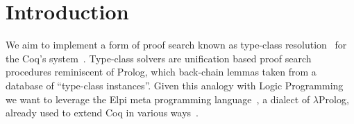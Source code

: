 \documentclass[sigconf,natbib=false,review]{acmart}
\newcommand{\UnifRel}{\ensuremath{\simeq}}
\newcommand{\Uo}{\texorpdfstring{\ensuremath{\UnifRel_o}\xspace}{unif\_o}}
\newcommand{\Ue}{\ensuremath{\UnifRel_m}\xspace}
\newcommand{\Fo}{\texorpdfstring{\ensuremath{\mathcal{O}}\xspace}{O}}
\newcommand{\Ho}{\texorpdfstring{\ensuremath{\mathcal{M}}\xspace}{M}}
\begin{document}
\begin{comment}
Specifying and implementing a proof system from scratch requires significant
effort. Logical Frameworks and Higher Order Logic Programming Languages provide
dedicated, high-level meta languages to facilitate this task in two ways: 1)
variable binding and substitution are for free when meta language binders
represent object logic ones; 2) proof construction, and
proof search, are greatly simplified by leveraging the unification procedure
provided by the meta language. Notable examples of meta languages are Elf,
Twelf, $\lambda$Prolog, Beluga, Abella and Isabelle which have been used to
implement or specify many formal systems such as First Order Logic, Set Theory,
Higher Order Logic, and the Calculus of Constructions.

The object logic we are interested in is Coq's type theory. We aim to develop a
higher-order unification-based proof search procedure using the meta language
Elpi, a dialect of $\lambda$Prolog. Elpi's equational theory includes
$\eta\beta$-equivalence and features a higher-order unification procedure \Ue
for the pattern fragment. Elpi offers an encoding of Coq terms that is suitable
for meta programming but that restricts \Ue to first-order unification problems
only. We refer to this basic encoding as \Fo.

In this paper we propose a more well-behaved encoding called \Ho, and show how
to translate unification problems from \Fo{} to corresponding ones in \Ho.
Consequently, we derive \Uo{}, the higher-order unification procedure of \Fo{}
that honours $\eta\beta$-equivalence (for Coq functions), addresses problems
within the pattern fragment, and allows for the use of heuristics to deal with
problems outside the pattern fragment. Moreover, as \Uo{} delegates most of the
work to \Ue, it can be used to efficiently simulate a logic program in \Fo{} by
taking advantage of unification-related optimizations of the meta language, such
as clause indexing.
\end{comment}


\maketitle

\section{Introduction}
\label{sec:intro}
We aim to implement a
form of proof search known as type-class resolution~\cite{wadler89,sozeau08}
for the Coq's system~\cite{Coq-refman}.
Type-class solvers are unification based proof search procedures
reminiscent of Prolog, which back-chain lemmas taken
from a database of ``type-class instances''. Given this
analogy with Logic Programming we want to leverage the
Elpi meta programming language~\cite{tassi:hal-01637063},
a dialect of $\lambda$Prolog, already used to extend
Coq in various ways~\cite{tassi:hal-01637063,tassi:hal-01897468,gregoire:hal-03800154,newtc}.
\end{document}
